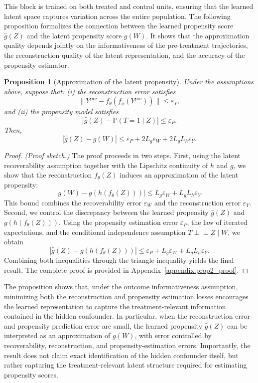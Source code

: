 \documentclass[10pt]{article} %
\newtheorem{proposition}{Proposition}
\begin{document}
This block is trained on both treated and control units, ensuring that the learned latent space captures variation across the entire population.
{The following proposition formalizes the connection between the learned propensity score $\hat g(Z)$ and the latent propensity score $g(W)$. It shows that the approximation quality depends jointly on the informativeness of the pre-treatment trajectories, the reconstruction quality of the latent representation, and the accuracy of the propensity estimator.}
{
\begin{proposition}[Approximation of the latent propensity]
Under the assumptions above, suppose that:
(i) the reconstruction error satisfies 
\[
\|Y^{\mathrm{pre}} - f_{\theta}(f_{\phi}(Y^{\mathrm{pre}}))\| \le \varepsilon_Y,
\]
and (ii) the propensity model satisfies
\[
|\hat g(Z)-\mathbb P(T=1 \mid Z)| \le \varepsilon_P.
\]
Then,
\[
|\hat g(Z)-g(W)|
\leq
\varepsilon_P
+
2L_g \varepsilon_W
+
2L_g L_h \varepsilon_Y.
\]
\end{proposition}}

{\begin{proof} \textit{(Proof sketch.)}
The proof proceeds in two steps. First, using the latent recoverability assumption together with the Lipschitz continuity of \(h\) and \(g\), we show that the reconstruction \(f_\theta(Z)\) induces an approximation of the latent propensity:
\[
|g(W)-g(h(f_\theta(Z)))|
\le
L_g\varepsilon_W + L_gL_h\varepsilon_Y.
\]
This bound combines the recoverability error \(\varepsilon_W\) and the reconstruction error \(\varepsilon_Y\).
Second, we control the discrepancy between the learned propensity \(\hat g(Z)\) and \(g(h(f_\theta(Z)))\). Using the propensity estimation error \(\varepsilon_P\), the law of iterated expectations, and the conditional independence assumption \(T  \perp\!\!\!\perp Z \mid W\), we obtain
\[
|\hat g(Z)-g(h(f_\theta(Z)))|
\le
\varepsilon_P + L_g\varepsilon_W + L_gL_h\varepsilon_Y.
\]
Combining both inequalities through the triangle inequality yields the final result. The complete proof is provided in Appendix~\ref{appendix:prop2_proof}.\end{proof}}
{
The proposition shows that, under the outcome informativeness assumption, minimizing both the reconstruction and propensity estimation losses encourages the learned representation to capture the treatment-relevant information contained in the hidden confounder. In particular, when the reconstruction error and propensity prediction error are small, the learned propensity $\hat g(Z)$ can be interpreted as an approximation of $g(W)$, with error controlled by recoverability, reconstruction, and propensity-estimation errors.
Importantly, the result does not claim exact identification of the hidden confounder itself, but rather capturing the treatment-relevant latent structure required for estimating propensity scores.}
\end{document}
